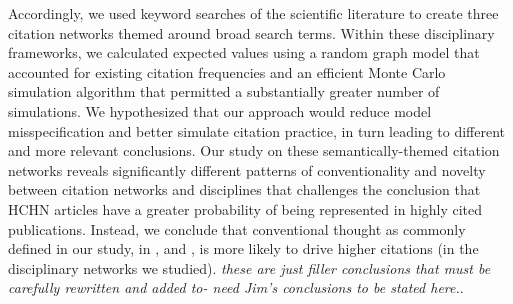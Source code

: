\documentclass[NETN]{stjour}
\begin{document}
Accordingly, we used keyword searches of the scientific literature to create three citation networks themed around broad search terms. Within these disciplinary frameworks, we calculated expected values using a random graph model that accounted for existing citation frequencies and an efficient Monte Carlo simulation algorithm that permitted a substantially greater number of simulations. We hypothesized that our approach would  reduce model misspecification and better simulate citation practice, in turn leading to different and more relevant conclusions. Our study on these semantically-themed citation networks reveals significantly different patterns of conventionality and novelty between  citation networks and disciplines that challenges the conclusion that HCHN articles have a greater probability of being represented in highly cited publications. 
Instead, we conclude that conventional thought as commonly defined in our study, 
in \citep{uzzi_atypical_2013}, and  \citep{boyack_vs_uzzi_2014}, is more likely to drive higher citations (in the disciplinary networks we studied).
 \emph{these are just filler conclusions that must be carefully rewritten and added to- need Jim's conclusions to be stated here.}.
\end{document}
